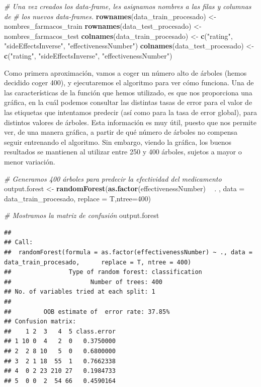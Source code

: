 \documentclass[spanish,]{article}
\newenvironment{Shaded}{\begin{snugshade}}{\end{snugshade}}
\newcommand{\KeywordTok}[1]{\textcolor[rgb]{0.13,0.29,0.53}{\textbf{#1}}}
\newcommand{\DataTypeTok}[1]{\textcolor[rgb]{0.13,0.29,0.53}{#1}}
\newcommand{\DecValTok}[1]{\textcolor[rgb]{0.00,0.00,0.81}{#1}}
\newcommand{\StringTok}[1]{\textcolor[rgb]{0.31,0.60,0.02}{#1}}
\newcommand{\CommentTok}[1]{\textcolor[rgb]{0.56,0.35,0.01}{\textit{#1}}}
\newcommand{\OperatorTok}[1]{\textcolor[rgb]{0.81,0.36,0.00}{\textbf{#1}}}
\newcommand{\NormalTok}[1]{#1}
\begin{document}
\begin{Shaded}
\begin{Highlighting}[]
\CommentTok{# Una vez creados los data-frame, les asignamos nombres a las filas y columnas de }
\CommentTok{# los nuevos data-frames.}
\KeywordTok{rownames}\NormalTok{(data_train_procesado) <-}\StringTok{ }\NormalTok{nombres_farmacos_train}
\KeywordTok{rownames}\NormalTok{(data_test_procesado) <-}\StringTok{ }\NormalTok{nombres_farmacos_test}
\KeywordTok{colnames}\NormalTok{(data_train_procesado) <-}\StringTok{ }\KeywordTok{c}\NormalTok{(}\StringTok{"rating"}\NormalTok{, }\StringTok{"sideEffectsInverse"}\NormalTok{, }\StringTok{"effectivenessNumber"}\NormalTok{)}
\KeywordTok{colnames}\NormalTok{(data_test_procesado) <-}\StringTok{ }\KeywordTok{c}\NormalTok{(}\StringTok{"rating"}\NormalTok{, }\StringTok{"sideEffectsInverse"}\NormalTok{, }\StringTok{"effectivenessNumber"}\NormalTok{)}
\end{Highlighting}
\end{Shaded}

Como primera aproximación, vamos a coger un número alto de árboles
(hemos decidido coger 400), y ejecutaremos el algoritmo para ver cómo
funciona. Una de las características de la función que hemos utilizado,
es que nos proporciona una gráfica, en la cuál podemos consultar las
distintas tasas de error para el valor de las etiquetas que intentamos
predecir (así como para la tasa de error global), para distintos valores
de árboles. Esta información es muy útil, puesto que nos permite ver, de
una manera gráfica, a partir de qué número de árboles no compensa seguir
entrenando el algoritmo. Sin embargo, viendo la gráfica, los buenos
resultados se mantienen al utilizar entre 250 y 400 árboles, sujetos a
mayor o menor variación.

\begin{Shaded}
\begin{Highlighting}[]
\CommentTok{# Generamos 400 árboles para predecir la efectividad del medicamento }
\NormalTok{output.forest <-}\StringTok{ }\KeywordTok{randomForest}\NormalTok{(}\KeywordTok{as.factor}\NormalTok{(effectivenessNumber) }\OperatorTok{~}\StringTok{ }\NormalTok{. , }
              \DataTypeTok{data =}\NormalTok{ data_train_procesado, }\DataTypeTok{replace =}\NormalTok{ T,}\DataTypeTok{ntree=}\DecValTok{400}\NormalTok{)}

\CommentTok{# Mostramos la matriz de confusión}
\NormalTok{output.forest}
\end{Highlighting}
\end{Shaded}

\begin{verbatim}
## 
## Call:
##  randomForest(formula = as.factor(effectivenessNumber) ~ ., data = data_train_procesado,      replace = T, ntree = 400) 
##                Type of random forest: classification
##                      Number of trees: 400
## No. of variables tried at each split: 1
## 
##         OOB estimate of  error rate: 37.85%
## Confusion matrix:
##    1 2  3   4  5 class.error
## 1 10 0  4   2  0   0.3750000
## 2  2 8 10   5  0   0.6800000
## 3  2 1 18  55  1   0.7662338
## 4  0 2 23 210 27   0.1984733
## 5  0 0  2  54 66   0.4590164
\end{verbatim}
\end{document}
